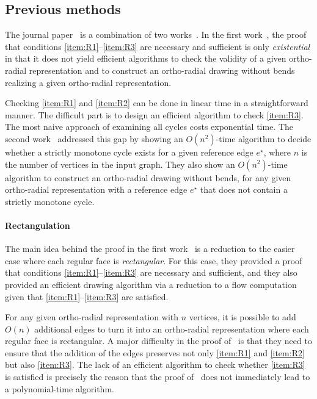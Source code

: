 \documentclass{article}\usepackage[a4paper,margin=20mm]{geometry}
\newcommand{\eref}{e^\star}
\begin{document}
\subsection{Previous methods}
The journal paper~\cite{barth2023topology} is a combination of two works~\cite{barth2017,niedermann19}.
In the first work~\cite{barth2017}, the proof that conditions \ref{item:R1}--\ref{item:R3} are necessary and sufficient is only \emph{existential} in that it does not yield efficient algorithms to check the {validity} of a given ortho-radial representation and to construct an ortho-radial drawing without bends realizing a given ortho-radial representation.

Checking \ref{item:R1} and \ref{item:R2} can be done in linear time in a straightforward manner. The difficult part is to design an efficient algorithm to check \ref{item:R3}. The most naive approach of examining all cycles costs exponential time. 
The second work~\cite{niedermann19} addressed this gap by showing an $O(n^2)$-time algorithm to decide whether a strictly monotone cycle exists for a given reference edge $\eref$, where $n$ is the number of vertices in the input graph. They also show an $O(n^2)$-time algorithm to construct an ortho-radial drawing without bends, for any given ortho-radial representation with a reference edge $\eref$ that does not contain a strictly monotone cycle.

\paragraph{Rectangulation}
The main idea behind the proof in the first work~\cite{barth2017} is a reduction to the easier case where each regular face is \emph{rectangular}. For this case, they provided a proof that conditions \ref{item:R1}--\ref{item:R3} are necessary and sufficient, and they also provided an efficient drawing algorithm via a reduction to a flow computation given that \ref{item:R1}--\ref{item:R3} are satisfied. 

For any given ortho-radial representation with $n$ vertices, it is possible to add $O(n)$ additional edges to turn it into an ortho-radial representation where each regular face is rectangular. A major difficulty in the proof of~\cite{barth2017} is that they need to ensure that the addition of the edges preserves not only \ref{item:R1} and \ref{item:R2} but also \ref{item:R3}.
The lack of an efficient algorithm to check whether \ref{item:R3} is satisfied is precisely the reason that the proof of~\cite{barth2017} does not immediately lead to a polynomial-time algorithm. 
\end{document}
